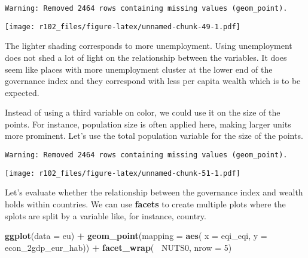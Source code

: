 \documentclass[]{article}
\newenvironment{Shaded}{\begin{snugshade}}{\end{snugshade}}
\newcommand{\DataTypeTok}[1]{\textcolor[rgb]{0.13,0.29,0.53}{#1}}
\newcommand{\DecValTok}[1]{\textcolor[rgb]{0.00,0.00,0.81}{#1}}
\newcommand{\KeywordTok}[1]{\textcolor[rgb]{0.13,0.29,0.53}{\textbf{#1}}}
\newcommand{\NormalTok}[1]{#1}
\newcommand{\OperatorTok}[1]{\textcolor[rgb]{0.81,0.36,0.00}{\textbf{#1}}}
\newcommand{\StringTok}[1]{\textcolor[rgb]{0.31,0.60,0.02}{#1}}
\begin{document}
\begin{verbatim}
Warning: Removed 2464 rows containing missing values (geom_point).
\end{verbatim}

\texttt{[image: r102\_files/figure-latex/unnamed-chunk-49-1.pdf]}

The lighter shading corresponds to more unemployment. Using unemployment does not shed a lot of light on the relationship between the variables. It does seem like places with more unemployment cluster at the lower end of the governance index and they correspond with less per capita wealth which is to be expected.

Instead of using a third variable on color, we could use it on the size of the points. For instance, population size is often applied here, making larger units more prominent. Let's use the total population variable for the size of the points.

\begin{Shaded}
\end{Shaded}

\begin{verbatim}
Warning: Removed 2464 rows containing missing values (geom_point).
\end{verbatim}

\texttt{[image: r102\_files/figure-latex/unnamed-chunk-51-1.pdf]}

Let's evaluate whether the relationship between the governance index and wealth holds within countries. We can use \textbf{facets} to create multiple plots where the splots are split by a variable like, for instance, country.

\begin{Shaded}
\begin{Highlighting}[]
\KeywordTok{ggplot}\NormalTok{(}\DataTypeTok{data =}\NormalTok{ eu) }\OperatorTok{+}
\StringTok{    }\KeywordTok{geom_point}\NormalTok{(}\DataTypeTok{mapping =} \KeywordTok{aes}\NormalTok{( }\DataTypeTok{x =}\NormalTok{ eqi_eqi, }\DataTypeTok{y =}\NormalTok{ econ_2gdp_eur_hab)) }\OperatorTok{+}
\StringTok{    }\KeywordTok{facet_wrap}\NormalTok{(}\OperatorTok{~}\StringTok{ }\NormalTok{NUTS0, }\DataTypeTok{nrow =} \DecValTok{5}\NormalTok{)}
\end{Highlighting}
\end{Shaded}
\end{document}
